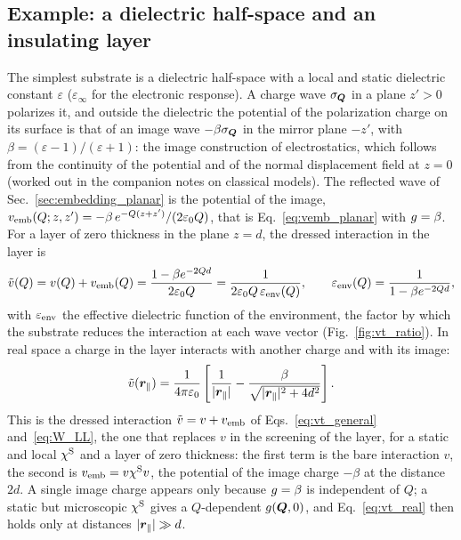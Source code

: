 \documentclass[10pt,a4paper]{paper}
\begin{document}
\subsection{Example: a dielectric half-space and an insulating layer}
\label{sec:embedding_example}

The simplest substrate is a dielectric half-space with a local and static dielectric constant $\varepsilon$
($\varepsilon_\infty$ for the electronic response). A charge wave $\sigma_{\bm{Q}}$ in a plane $z' > 0$ polarizes it, and
outside the dielectric the potential of the polarization charge on its surface is that of an image wave
$-\beta\sigma_{\bm{Q}}$ in the mirror plane $-z'$, with $\beta = (\varepsilon - 1)/(\varepsilon + 1)$: the image
construction of electrostatics, which follows from the continuity of the potential and of the normal displacement
field at $z = 0$ (worked out in the companion notes on classical models). The reflected wave of
Sec.~\ref{sec:embedding_planar} is the potential of the image, $v_{\mathrm{emb}}(Q;z,z') = -\beta\,e^{-Q(z + z')}/(2\varepsilon_0 Q)$,
that is Eq.~\eqref{eq:vemb_planar} with $g = \beta$.
For a layer of zero thickness in the plane $z = d$, the dressed interaction in the layer is
\begin{equation}
\tilde{v}(Q) = v(Q) + v_{\mathrm{emb}}(Q) = \frac{1 - \beta e^{-2Qd}}{2\varepsilon_0 Q} = \frac{1}{2\varepsilon_0 Q\,\varepsilon_{\mathrm{env}}(Q)} , \qquad
\varepsilon_{\mathrm{env}}(Q) = \frac{1}{1 - \beta e^{-2Qd}} ,
\label{eq:vt_sheet}
\end{equation}
with $\varepsilon_{\mathrm{env}}$ the effective dielectric function of the environment, the factor by which the substrate reduces the
interaction at each wave vector (Fig.~\ref{fig:vt_ratio}). In real space a charge in the layer interacts with another
charge and with its image:
\begin{equation}
\tilde{v}(\bm{r}_{\parallel}) = \frac{1}{4\pi\varepsilon_0}\left[\frac{1}{|\bm{r}_{\parallel}|} - \frac{\beta}{\sqrt{|\bm{r}_{\parallel}|^2 + 4d^2}}\right] .
\label{eq:vt_real}
\end{equation}
This is the dressed interaction $\tilde{v} = v + v_{\mathrm{emb}}$ of Eqs.~\eqref{eq:vt_general} and~\eqref{eq:W_LL}, the one that
replaces $v$ in the screening of the layer, for a static and local $\chi^{\mathrm{S}}$ and a layer of zero thickness: the first
term is the bare interaction $v$, the second is $v_{\mathrm{emb}} = v\chi^{\mathrm{S}} v$, the potential of the image charge $-\beta$ at the
distance $2d$. A single image charge appears only because $g = \beta$ is independent of $Q$; a static but microscopic
$\chi^{\mathrm{S}}$ gives a $Q$-dependent $g(\bm{Q},0)$, and Eq.~\eqref{eq:vt_real} then holds only at distances
$|\bm{r}_{\parallel}| \gg d$.
\end{document}
